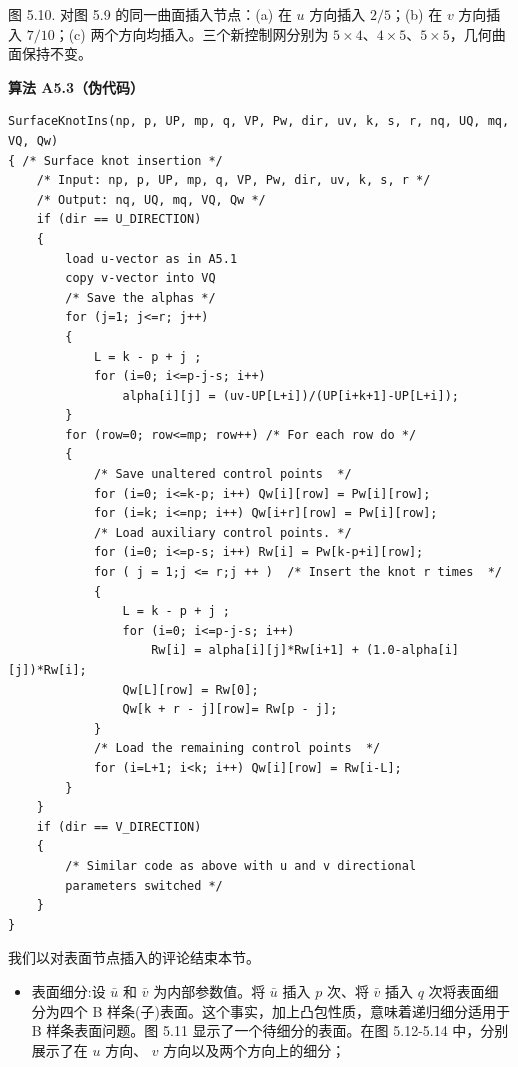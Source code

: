 \documentclass[../main.tex]{subfiles}
\begin{document}
\begin{center}
\begin{minipage}{24cm}
\vspace*{.6\baselineskip}
\centering
{}
\par\smallskip
图 5.10. 对图 5.9 的同一曲面插入节点：(a) 在 \(u\) 方向插入 \(2/5\)；(b) 在 \(v\) 方向插入 \(7/10\)；(c) 两个方向均插入。三个新控制网分别为 \(5\times4\)、\(4\times5\)、\(5\times5\)，几何曲面保持不变。
\end{minipage}
\end{center}

\par\medskip\noindent\textbf{算法 A5.3（伪代码）}\par
\begin{verbatim}
SurfaceKnotIns(np, p, UP, mp, q, VP, Pw, dir, uv, k, s, r, nq, UQ, mq, VQ, Qw)
{ /* Surface knot insertion */
    /* Input: np, p, UP, mp, q, VP, Pw, dir, uv, k, s, r */
    /* Output: nq, UQ, mq, VQ, Qw */
    if (dir == U_DIRECTION)
    {
        load u-vector as in A5.1
        copy v-vector into VQ
        /* Save the alphas */
        for (j=1; j<=r; j++)
        {
            L = k - p + j ;
            for (i=0; i<=p-j-s; i++)
                alpha[i][j] = (uv-UP[L+i])/(UP[i+k+1]-UP[L+i]);
        }
        for (row=0; row<=mp; row++) /* For each row do */
        {
            /* Save unaltered control points  */
            for (i=0; i<=k-p; i++) Qw[i][row] = Pw[i][row];
            for (i=k; i<=np; i++) Qw[i+r][row] = Pw[i][row];
            /* Load auxiliary control points. */
            for (i=0; i<=p-s; i++) Rw[i] = Pw[k-p+i][row];
            for ( j = 1;j <= r;j ++ )  /* Insert the knot r times  */
            {
                L = k - p + j ;
                for (i=0; i<=p-j-s; i++)
                    Rw[i] = alpha[i][j]*Rw[i+1] + (1.0-alpha[i][j])*Rw[i];
                Qw[L][row] = Rw[0];
                Qw[k + r - j][row]= Rw[p - j];
            }
            /* Load the remaining control points  */
            for (i=L+1; i<k; i++) Qw[i][row] = Rw[i-L];
        }
    }
    if (dir == V_DIRECTION)
    {
        /* Similar code as above with u and v directional
        parameters switched */
    }
}
\end{verbatim}

我们以对表面节点插入的评论结束本节。

\begin{itemize}
\item 表面细分:设 \(\bar{u}\) 和 \(\bar{v}\) 为内部参数值。将 \(\bar u\) 插入 \(p\) 次、将 \(\bar v\) 插入 \(q\) 次将表面细分为四个 B 样条(子)表面。这个事实，加上凸包性质，意味着递归细分适用于 B 样条表面问题。图 5.11 显示了一个待细分的表面。在图 5.12-5.14 中，分别展示了在 \(u\) 方向、 \(v\) 方向以及两个方向上的细分；
\end{itemize}
\end{document}
